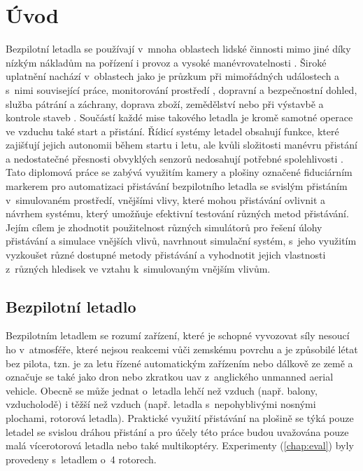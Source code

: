 \chapter{Úvod} \label{chap:introduction}




Bezpilotní letadla se používají v~mnoha oblastech lidské činnosti mimo jiné díky nízkým nákladům na pořízení i provoz a vysoké manévrovatelnosti \cite{Hayat2016}. Široké uplatnění nachází v~oblastech jako je průzkum při mimořádných událostech a s~nimi související práce, monitorování prostředí \cite{Xin2022}, dopravní a bezpečnostní dohled, služba pátrání a záchrany, doprava zboží, zemědělství nebo při výstavbě a kontrole staveb \cite{Shakhatreh2019}. Součástí každé mise takového letadla je kromě samotné operace ve vzduchu také start a přistání. Řídicí systémy letadel obsahují funkce, které zajišťují jejich autonomii během startu i letu, ale kvůli složitosti manévru přistání a nedostatečné přesnosti obvyklých senzorů nedosahují potřebné spolehlivosti \cite{icuas}. Tato diplomová práce se zabývá využitím kamery a plošiny označené fiduciárním markerem pro automatizaci přistávání bezpilotního letadla se svislým přistáním v~simulovaném prostředí, vnějšími vlivy, které mohou přistávání ovlivnit a návrhem systému, který umožňuje efektivní testování různých metod přistávání. Jejím cílem je zhodnotit použitelnost různých simulátorů pro řešení úlohy přistávání a simulace vnějších vlivů, navrhnout simulační systém, s~jeho využitím vyzkoušet různé dostupné metody přistávání a vyhodnotit jejich vlastnosti z~různých hledisek ve vztahu k~simulovaným vnějším vlivům.

\section{Bezpilotní letadlo}
Bezpilotním letadlem se rozumí zařízení, které je schopné vyvozovat síly nesoucí ho v~atmosféře, které nejsou reakcemi vůči zemskému povrchu a je způsobilé létat bez pilota, tzn. je za letu řízené automatickým zařízením nebo dálkově ze země a označuje se také jako dron nebo zkratkou \acrshort{uav} z~anglického unmanned aerial vehicle. Obecně se může jednat o~letadla lehčí než vzduch (např. balony, vzducholodě) i těžší než vzduch (např. letadla s~nepohyblivými nosnými plochami, rotorová letadla). \cite{csn310001} Praktické využití přistávání na plošině se týká pouze letadel se svislou dráhou přistání a pro účely této práce budou uvažována pouze malá vícerotorová letadla nebo také multikoptéry. Experimenty (\cref{chap:eval}) byly provedeny s~letadlem o~4 rotorech.

